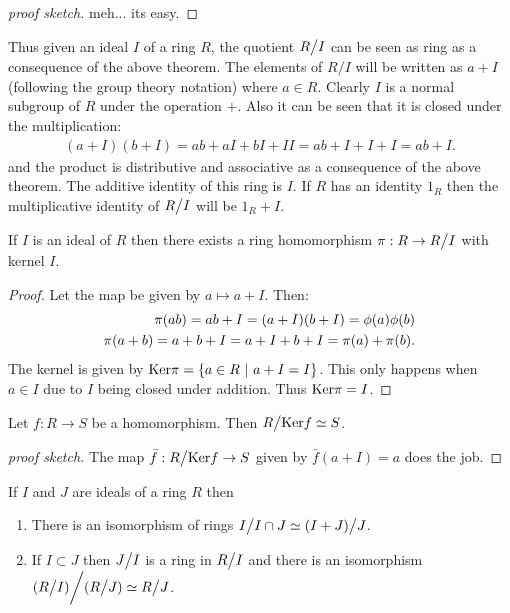 \begin{proof}[proof sketch]
  meh... its easy.
\end{proof}
\begin{remark}
  Thus given an ideal $I$ of a ring $R$, the quotient $R\bign/ I$ can be seen as ring as a consequence of the above theorem. The elements of $R/I$ will be written as $a+I$ (following the group theory notation) where $a\in R$. Clearly $I$ is a normal subgroup of $R$ under the operation $+$. Also it can be seen that it is closed under the multiplication:
  \begin{align*}
    (a+I)(b+I) = ab + aI + bI + II = ab + I + I + I = ab +I.
  \end{align*}
  and the product is distributive and associative as a consequence of the above theorem. The additive identity of this ring is $I$. If $R$ has an identity $1_R$ then the multiplicative identity of $R\bign/I$ will be $1_R+I$.
\end{remark}
\begin{theorem}
  If $I$ is an ideal of $R$ then there exists a ring homomorphism $\pi:R\to R\bign/ I$ with kernel $I$.
\end{theorem}
\begin{proof}
  Let the map be given by $a \mapsto a+I$. Then:
  \begin{align*}
    \pi(ab) = ab +I = (a+I)(b+I) = \phi(a)\phi(b)\\
    \pi(a+b) = a+b+I = a+I + b+I = \pi(a)+\pi(b).
  \end{align*}
  The kernel is given by $\text{Ker} \pi = \{a\in R\ |\ a+I = I\}$. This only happens when $a\in I$ due to $I$ being closed under addition. Thus $\text{Ker} \pi = I$.
\end{proof}
\begin{theorem}
  Let $f:R\to S$ be a homomorphism. Then $R\bign/\Ker f \simeq S$.
\end{theorem}
\begin{proof}[proof sketch]
  The map $\bar{f}: R\bign/ \Ker f \to S$ given by $\bar{f}(a+I) = a$ does the job.
\end{proof}
\begin{theorem}
  If $I$ and $J$ are ideals of a ring $R$ then
  \begin{enumerate}
    \item There is an isomorphism of rings $I\bign/I\cap J \simeq (I+J)\bign/J$.
    \item If $I\subset J$ then $J\bign/I$ is a ring in $R\bign/I$ and there is an isomorphism $(R\bign/ I)\bigg/ (R\bign/J) \simeq R\bign /J$.
  \end{enumerate}
\end{theorem}
